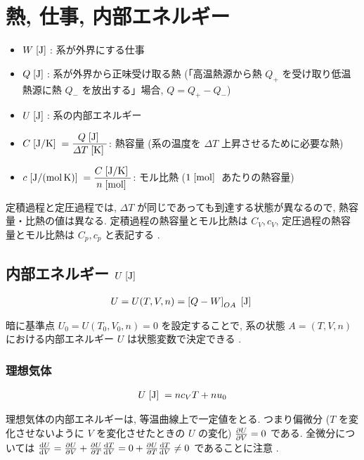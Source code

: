 \documentclass[a4paper,11pt]{jsarticle}
\newcommand{\braunit}[1]{\;\text{[}\unit[per-mode = symbol]{#1}\text{]}\;}
\begin{document}
\section{熱, 仕事, 内部エネルギー}
\begin{itemize}
  \item $W\braunit{\J}$: 系が外界にする仕事
  \item $Q\braunit{\J}$: 系が外界から正味受け取る熱 (「高温熱源から熱 $Q_+$ を受け取り低温熱源に熱 $Q_-$ を放出する」場合, $Q = Q_+ - Q_-$)
  \item $U\braunit{\J}$: 系の内部エネルギー
  \item $C\braunit{\J\per\K} = \dfrac{Q\braunit{\J}}{\varDelta T\braunit{\K}}$: 熱容量 (系の温度を $\varDelta T$ 上昇させるために必要な熱)
  \item $c\braunit{\J\per\mole\per\K} = \dfrac{C\braunit{\J\per\K}}{n\braunit{\mole}}$: モル比熱 ($1\braunit{\mole}$ あたりの熱容量)
\end{itemize}
\par 定積過程と定圧過程では, $\varDelta T$ が同じであっても到達する状態が異なるので, 熱容量・比熱の値は異なる.
定積過程の熱容量とモル比熱は $C_V, c_V$, 定圧過程の熱容量とモル比熱は $C_p, c_p$ と表記する
\cite[pp.38]{thermo}.

\subsection{内部エネルギー \texorpdfstring{$U\braunit{\J}$}{U[J]}}
\begin{align*}
  U = U(T, V, n) = \left[Q - W\right]_{OA} \braunit{\J}
\end{align*}
\par 暗に基準点 $U_0 = U(T_0, V_0, n) = 0$ を設定することで, 系の状態 $A = (T, V, n)$ における内部エネルギー $U$ は状態変数で決定できる
\cite[pp.65]{thermo}.

\subsubsection{理想気体}
\begin{align*}
  U\braunit{\J} = nc_VT + nu_0
\end{align*}
\par 理想気体の内部エネルギーは, 等温曲線上で一定値をとる.
つまり偏微分 ($T$ を変化させないように $V$ を変化させたときの $U$ の変化) $\pdv{U}{V} = 0$ である.
全微分については $\dv{U}{V} = \pdv{U}{V} + \pdv{U}{T}\dv{T}{V} = 0 + \pdv{U}{T}\dv{T}{V} \neq 0$ であることに注意
\cite[pp.67]{thermo}.
\end{document}
